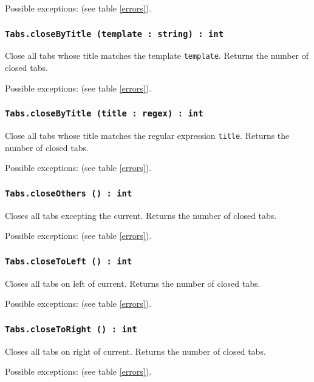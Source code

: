 Possible exceptions:  (see table \ref{errors}).

\subsubsection{\texttt{Tabs.closeByTitle (template : string) : int}}

Close all tabs whose title matches the template \texttt{template}. Returns the number of closed tabs.

Possible exceptions:  (see table \ref{errors}).

\subsubsection{\texttt{Tabs.closeByTitle (title : regex) : int}}

Close all tabs whose title matches the regular expression \texttt{title}. Returns the number of closed tabs.

Possible exceptions:  (see table \ref{errors}).

\subsubsection{\texttt{Tabs.closeOthers () : int}}

Closes all tabs excepting the current. Returns the number of closed tabs.

Possible exceptions:  (see table \ref{errors}).

\subsubsection{\texttt{Tabs.closeToLeft () : int}}

Closes all tabs on left of current. Returns the number of closed tabs.

Possible exceptions:  (see table \ref{errors}).

\subsubsection{\texttt{Tabs.closeToRight () : int}}

Closes all tabs on right of current.  Returns the number of closed tabs.

Possible exceptions:  (see table \ref{errors}).

